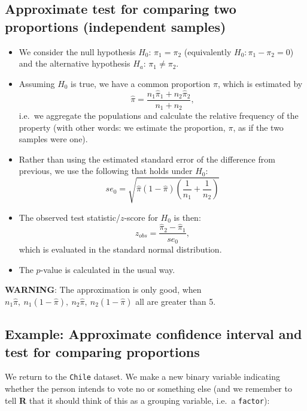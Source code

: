 \documentclass[]{article}
\newenvironment{Shaded}{\begin{snugshade}}{\end{snugshade}}
\newcommand{\KeywordTok}[1]{\textcolor[rgb]{0.13,0.29,0.53}{\textbf{#1}}}
\newcommand{\DataTypeTok}[1]{\textcolor[rgb]{0.13,0.29,0.53}{#1}}
\newcommand{\StringTok}[1]{\textcolor[rgb]{0.31,0.60,0.02}{#1}}
\newcommand{\OperatorTok}[1]{\textcolor[rgb]{0.81,0.36,0.00}{\textbf{#1}}}
\newcommand{\NormalTok}[1]{#1}
\providecommand{\tightlist}{%
  \setlength{\itemsep}{0pt}\setlength{\parskip}{0pt}}
\begin{document}
\subsection{Approximate test for comparing two proportions (independent
samples)}\label{approximate-test-for-comparing-two-proportions-independent-samples}

\begin{itemize}
\tightlist
\item
  We consider the null hypothesis \(H_0\): \(\pi_1=\pi_2\) (equivalently
  \(H_0: \pi_1 - \pi_2 = 0\)) and the alternative hypothesis \(H_a\):
  \(\pi_1 \neq \pi_2\).
\item
  Assuming \(H_0\) is true, we have a common proportion \(\pi\), which
  is estimated by \[
    \hat{\pi}=\frac{n_1\hat{\pi}_1+n_2\hat{\pi}_2}{n_1+n_2},
    \] i.e.~we aggregate the populations and calculate the relative
  frequency of the property (with other words: we estimate the
  proportion, \(\pi\), as if the two samples were one).
\item
  Rather than using the estimated standard error of the difference from
  previous, we use the following that holds under \(H_0\): \[
    se_0=\sqrt{\hat{\pi}(1-\hat{\pi})\left(\frac{1}{n_1}+\frac{1}{n_2}\right)}
    \]
\item
  The observed test statistic/\(z\)-score for \(H_0\) is then: \[
    z_{obs}=\frac{\hat{\pi}_2-\hat{\pi}_1}{se_0},
    \] which is evaluated in the standard normal distribution.
\item
  The \(p\)-value is calculated in the usual way.
\end{itemize}

\textbf{WARNING}: The approximation is only good, when \(n_1\hat{\pi},\
n_1(1-\hat{\pi}),\ n_2\hat{\pi},\ n_2(1-\hat{\pi})\) all are greater
than 5.

\subsection{Example: Approximate confidence interval and test for
comparing
proportions}\label{example-approximate-confidence-interval-and-test-for-comparing-proportions}

We return to the \texttt{Chile} dataset. We make a new binary variable
indicating whether the person intends to vote no or something else (and
we remember to tell \textbf{R} that it should think of this as a
grouping variable, i.e.~a \texttt{factor}):

\begin{Shaded}
\end{Shaded}
\end{document}
